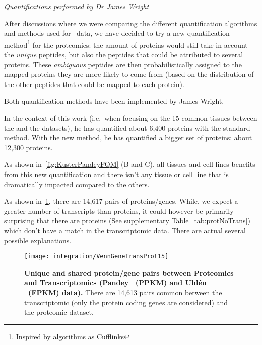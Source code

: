 \textit{Quantifications performed by Dr James Wright}

After discussions where we were comparing the different quantification algorithms
and methods used for \Rnaseq\ data, we have decided to try a new quantification
method\footnote{Inspired by algorithms as Cufflinks} for the proteomics:
the amount of proteins would still take in account the \emph{unique} peptides,
but also the peptides that could be attributed to several proteins.
These \emph{ambiguous} peptides are then probabilistically assigned to the
mapped proteins they are more likely to come from (based on the distribution of
the other peptides that could be mapped to each protein).

Both quantification methods have been implemented by James Wright.

In the context of this work (i.e.\ when focusing on the 15 common tissues between
the  and the  datasets),
he has quantified about 6,400 proteins with
the standard method. With the new method, he has quantified a bigger set of
proteins: about 12,300 proteins.

As shown in~\cref{fig:KusterPandeyFQM} (B and C),
all tissues and cell lines benefits from this new quantification and there isn't
any tissue or cell line that is dramatically impacted compared to the others.

As shown in~\cref{fig:VennGeneTransProt15}, there are 14,617 pairs of
proteins/genes. While, we expect a greater number of transcripts than proteins,
it could however be primarily surprising that there are proteins
(See supplementary Table~\cref{tab:protNoTrans}) which don't have
a match in the transcriptomic data. There are actual several possible explanations.

\begin{figure}
    \texttt{[image: integration/VennGeneTransProt15]}\centering
    \caption[Unique and shared protein/gene pairs between Proteomics and
    Transcriptomics (Pandey \etal\ (PPKM) and Uhlén \etal\ (\gls{FPKM})
    data)]
    {\label{fig:VennGeneTransProt15}\textbf{Unique and shared protein/gene
    pairs between Proteomics and Transcriptomics (Pandey \etal\ (PPKM) and Uhlén
    \etal\  (\gls{FPKM}) data).} There are 14,613 pairs common between the
    transcriptomic (only the protein coding genes are considered)
    and the proteomic dataset.}
\end{figure}

